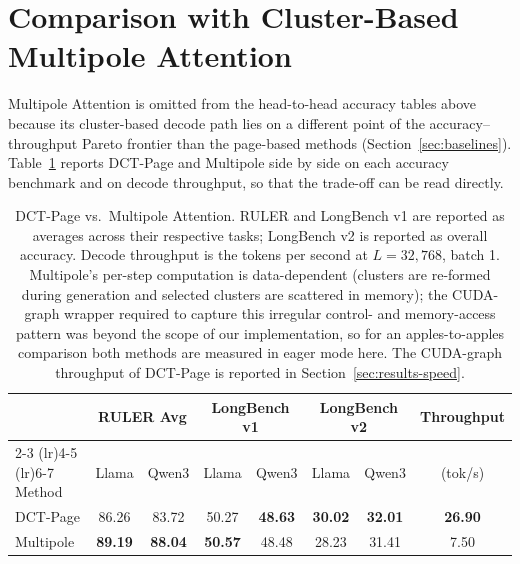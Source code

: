 \section{Comparison with Cluster-Based Multipole Attention}\label{sec:results-multipole}

Multipole Attention is omitted from the head-to-head accuracy tables
above because its cluster-based decode path lies on a different point
of the accuracy--throughput Pareto frontier than the page-based
methods (Section~\ref{sec:baselines}).
Table~\ref{tab:multipole} reports DCT-Page and Multipole side by side
on each accuracy benchmark and on decode throughput, so that the
trade-off can be read directly.


\begin{table}[ht]
  \centering
  \caption[DCT-Page vs.\ Multipole: accuracy and throughput.]
  {DCT-Page vs.\ Multipole Attention.  RULER and LongBench v1 are
   reported as averages across their respective tasks; LongBench v2
   is reported as overall accuracy.  Decode throughput is the tokens
   per second at $L = 32{,}768$, batch 1.  Multipole's per-step
   computation is data-dependent (clusters are re-formed during
   generation and selected clusters are scattered in memory); the
   CUDA-graph wrapper required to capture this irregular control- and
   memory-access pattern was beyond the scope of our implementation,
   so for an apples-to-apples comparison both methods are measured in
   eager mode here.  The CUDA-graph throughput of DCT-Page is
   reported in Section~\ref{sec:results-speed}.}
  \label{tab:multipole}
  \footnotesize
  \setlength{\tabcolsep}{5pt}
  \begin{tabular}{l cc cc cc c}
    \toprule
    & \multicolumn{2}{c}{RULER Avg}
    & \multicolumn{2}{c}{LongBench v1}
    & \multicolumn{2}{c}{LongBench v2}
    & Throughput \\
    \cmidrule(lr){2-3} \cmidrule(lr){4-5} \cmidrule(lr){6-7}
    Method
      & Llama & Qwen3
      & Llama & Qwen3
      & Llama & Qwen3
      & (tok/s) \\
    \midrule
    DCT-Page  & 86.26 & 83.72 & 50.27 & \textbf{48.63} & \textbf{30.02} & \textbf{32.01} & \textbf{26.90} \\
    Multipole & \textbf{89.19} & \textbf{88.04} & \textbf{50.57} & 48.48 & 28.23 & 31.41 & 7.50 \\
    \bottomrule
  \end{tabular}
\end{table}


